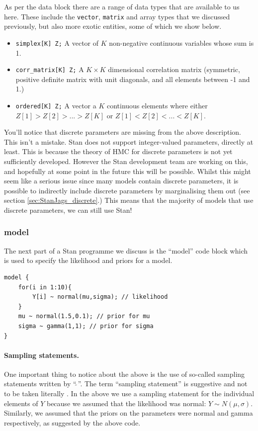 \documentclass[11pt,fullpage]{book}
\begin{document}
As per the data block there are a range of data types that are available to us here. These include the \texttt{vector}, \texttt{matrix} and array types that we discussed previously, but also more exotic entities, some of which we show below.

\begin{itemize}
\item \texttt{simplex[K] Z;} A vector of $K$ non-negative continuous variables whose sum is 1.
\item \texttt{corr_matrix[K] Z;} A $K\times K$ dimensional correlation matrix (symmetric, positive definite matrix with unit diagonals, and all elements between -1 and 1.)
\item \texttt{ordered[K] Z;} A vector a $K$ continuous elements where either $Z[1] > Z[2] > ... > Z[K]$ or $Z[1] < Z[2] < ... < Z[K]$.
\end{itemize}

You'll notice that discrete parameters are missing from the above description. This isn't a mistake. Stan does not support integer-valued parameters, directly at least. This is because the theory of HMC for discrete parameters is not yet sufficiently developed. However the Stan development team are working on this, and hopefully at some point in the future this will be possible. Whilst this might seem like a serious issue since many models contain discrete parameters, it is possible to indirectly include discrete parameters by marginalising them out (see section \ref{sec:StanJags_discrete}.) This means that the majority of models that use discrete parameters, we can still use Stan!

\subsubsection{model}
The next part of a Stan programme we discuss is the ``model'' code block which is used to specify the likelihood and priors for a model.
	\begin{verbatim}
model {
    for(i in 1:10){
        Y[i] ~ normal(mu,sigma); // likelihood
    }
    mu ~ normal(1.5,0.1); // prior for mu
    sigma ~ gamma(1,1); // prior for sigma
}
	\end{verbatim}
\paragraph{Sampling statements.} One important thing to notice about the above is the use of so-called sampling statements written by ``$\tilde{~}$''. The term ``sampling statement'' is suggestive and not to be taken literally \cite{carpenter2016stan}. In the above we use a sampling statement for the individual elements of $Y$ because we assumed that the likelihood was normal: $Y\sim N(\mu,\sigma)$. Similarly, we assumed that the priors on the parameters were normal and gamma respectively, as suggested by the above code.
\end{document}
